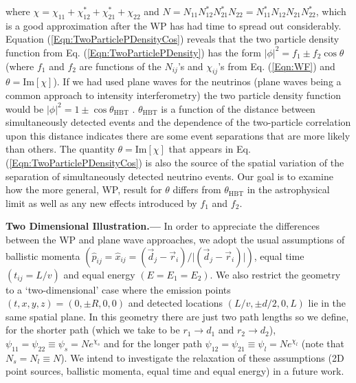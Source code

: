 \documentclass[aps,prl,reprint,floatfix
]{revtex4-1}
\newcommand{\heading}[1]{\textbf{#1.---}}
\begin{document}
where $\chi=\chi_{11}+\chi_{12}^*+\chi_{21}^*+\chi_{22}$ and $N=N_{11}N_{12}^*N_{21}^*N_{22}=N_{11}^*N_{12}N_{21}N_{22}^*$, which is a good approximation after the WP has had time to spread out considerably. Equation (\ref{Eqn:TwoParticlePDensityCos}) reveals that the two particle density function from Eq. (\ref{Eqn:TwoParticlePDensity}) has the form $\vert\phi\vert^2=f_1\pm f_2\cos\theta$ (where $f_1$ and $f_2$ are functions of the $N_{ij}$'s and $\chi_{ij}$'s from Eq. (\ref{Eqn:WF}) and $\theta=\text{Im}\left[\chi\right]$). If we had used plane waves for the neutrinos (plane waves being a common approach to intensity interferometry) the two particle density function would be $\vert\phi\vert^2=1\pm\cos\theta_\text{HBT}$ \cite{2006PhRvL..96l1802G}. $\theta_\text{HBT}$ is a function of the distance between simultaneously detected events and the dependence of the two-particle correlation upon this distance indicates there are some event separations that are more likely than others. The quantity $\theta=\text{Im}\left[\chi\right]$ that appears in Eq. (\ref{Eqn:TwoParticlePDensityCos}) is also the source of the spatial variation of the separation of simultaneously detected neutrino events. Our goal is to examine how the more general, WP, result for $\theta$ differs from $\theta_\text{HBT}$ in the astrophysical limit as well as any new effects introduced by $f_1$ and $f_2$.

\heading{Two Dimensional Illustration}
In order to appreciate the differences between the WP and plane wave approaches, we adopt the usual assumptions of ballistic momenta $(\hat{p}_{ij}=\hat{x}_{ij}=(\vec{d}_j-\vec{r}_i)/\vert(\vec{d}_j-\vec{r}_i)\vert)$, equal time $\left(t_{ij}=L/v\right)$ and equal energy $\left(E=E_1=E_2\right)$. We also restrict the geometry to a `two-dimensional' case where the emission points $\left(t,x,y,z\right) = \left(0,\pm R,0,0\right)$ and detected locations $\left(L/v,\pm d/2,0,L\right)$ lie in the same spatial plane. In this geometry there are just two path lengths so we define, for the shorter path (which we take to be $r_1 \rightarrow d_1$ and $r_2 \rightarrow d_2$), $\psi_{11}=\psi_{22}\equiv\psi_s=N e^{\chi_s}$ and for the longer path $\psi_{12}=\psi_{21}\equiv\psi_l=N e^{\chi_l}$ (note that $N_s=N_l\equiv N$). We intend to investigate the relaxation of these assumptions (2D point sources, ballistic momenta, equal time and equal energy) in a future work.
\end{document}
